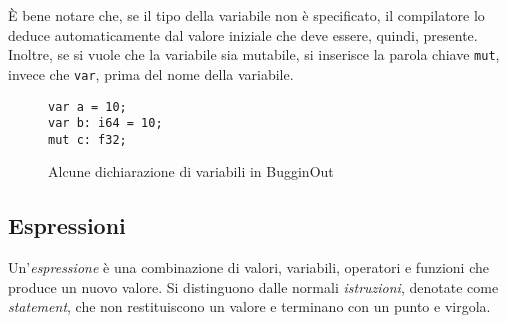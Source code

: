 \`E bene notare che, se il tipo della variabile non \`e specificato, il compilatore lo deduce automaticamente dal valore iniziale che deve essere, quindi, presente. Inoltre, se si vuole che la variabile sia mutabile, si inserisce la parola chiave \texttt{mut}, invece che \texttt{var}, prima del nome della variabile.

\begin{figure}[H]
	\centering
	\begin{verbatim}
var a = 10;
var b: i64 = 10;
mut c: f32;
	\end{verbatim}
	\caption{Alcune dichiarazione di variabili in BugginOut}
	\label{fig:variables-example}
\end{figure}

\subsection{Espressioni}
\label{ssec:espressioni}

Un'\emph{espressione} \`e una combinazione di valori, variabili, operatori e funzioni che produce un nuovo valore. Si distinguono dalle normali \emph{istruzioni}, denotate come \emph{statement}, che non restituiscono un valore e terminano con un punto e virgola.


